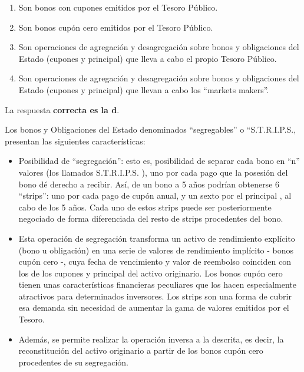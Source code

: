 \documentclass[
  letterpaper,
  DIV=11,
  numbers=noendperiod]{scrreprt}
\begin{document}
\begin{tcolorbox}
\begin{enumerate}
\def\labelenumi{\alph{enumi}.}
\item
  Son bonos con cupones emitidos por el Tesoro Público.
\item
  Son bonos cupón cero emitidos por el Tesoro Público.
\item
  Son operaciones de agregación y desagregación sobre bonos y
  obligaciones del Estado (cupones y principal) que lleva a cabo el
  propio Tesoro Público.
\item
  Son operaciones de agregación y desagregación sobre bonos y
  obligaciones del Estado (cupones y principal) que llevan a cabo los
  ``markets makers''.
\end{enumerate}

\begin{tcolorbox}[enhanced jigsaw, toprule=.15mm, left=2mm, arc=.35mm, breakable, bottomrule=.15mm, opacityback=0, rightrule=.15mm, leftrule=.75mm, colframe=quarto-callout-note-color-frame, colback=white]
\begin{minipage}[t]{5.5mm}
\textcolor{quarto-callout-note-color}{\faInfo}
\end{minipage}%
\begin{minipage}[t]{\textwidth - 5.5mm}

La respuesta \textbf{correcta es la d}.

Los bonos y Obligaciones del Estado denominados ``segregables'' o
``S.T.R.I.P.S., presentan las siguientes características:

\begin{itemize}
\item
  Posibilidad de ``segregación'': esto es, posibilidad de separar cada
  bono en ``n'' valores (los llamados S.T.R.I.P.S. ), uno por cada pago
  que la posesión del bono dé derecho a recibir. Así, de un bono a 5
  años podrían obtenerse 6 ``strips'': uno por cada pago de cupón anual,
  y un sexto por el principal , al cabo de los 5 años. Cada uno de estos
  strips puede ser posteriormente negociado de forma diferenciada del
  resto de strips procedentes del bono.
\item
  Esta operación de segregación transforma un activo de rendimiento
  explícito (bono u obligación) en una serie de valores de rendimiento
  implícito - bonos cupón cero -, cuya fecha de vencimiento y valor de
  reembolso coinciden con los de los cupones y principal del activo
  originario. Los bonos cupón cero tienen unas características
  financieras peculiares que los hacen especialmente atractivos para
  determinados inversores. Los strips son una forma de cubrir esa
  demanda sin necesidad de aumentar la gama de valores emitidos por el
  Tesoro.
\item
  Además, se permite realizar la operación inversa a la descrita, es
  decir, la reconstitución del activo originario a partir de los bonos
  cupón cero procedentes de su segregación.
\end{itemize}


\end{minipage}
\end{tcolorbox}
\end{tcolorbox}
\end{document}
